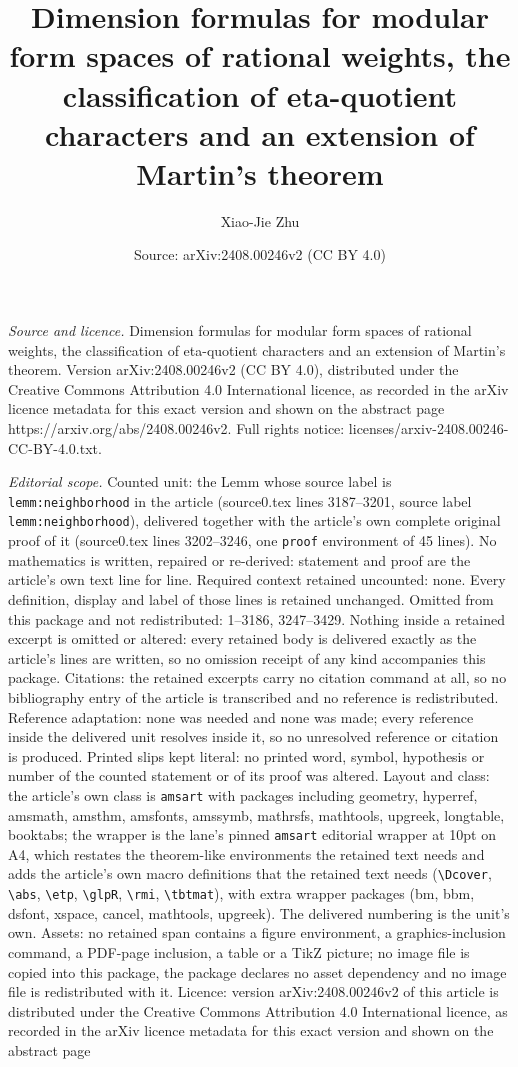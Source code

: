 \documentclass[10pt,a4paper]{amsart}
\title[Dimension formulas for modular form spaces of rational weigh]{Dimension formulas for modular form spaces of rational weights, the classification of eta-quotient characters and an extension of Martin's theorem}
\author{Xiao-Jie Zhu}
\date{Source: arXiv:2408.00246v2 (CC BY 4.0)}
\begin{document}
\maketitle

\noindent\emph{Source and licence.} Dimension formulas for modular form spaces of rational weights, the classification of eta-quotient characters and an extension of Martin's theorem. Version arXiv:2408.00246v2 (CC BY 4.0), distributed under the Creative Commons Attribution 4.0 International licence, as recorded in the arXiv licence metadata for this exact version and shown on the abstract page https://arxiv.org/abs/2408.00246v2. Full rights notice: licenses/arxiv-2408.00246-CC-BY-4.0.txt.\par\smallskip

\noindent\textit{Editorial scope.} Counted unit: the Lemm whose source label is \texttt{lemm:neighborhood} in the article (source0.tex lines 3187--3201, source label \texttt{lemm:neighborhood}), delivered together with the article's own complete original proof of it (source0.tex lines 3202--3246, one \texttt{proof} environment of 45 lines). No mathematics is written, repaired or re-derived: statement and proof are the article's own text line for line. Required context retained uncounted: none. Every definition, display and label of those lines is retained unchanged. Omitted from this package and not redistributed: 1--3186, 3247--3429. Nothing inside a retained excerpt is omitted or altered: every retained body is delivered exactly as the article's lines are written, so no omission receipt of any kind accompanies this package. Citations: the retained excerpts carry no citation command at all, so no bibliography entry of the article is transcribed and no reference is redistributed. Reference adaptation: none was needed and none was made; every reference inside the delivered unit resolves inside it, so no unresolved reference or citation is produced. Printed slips kept literal: no printed word, symbol, hypothesis or number of the counted statement or of its proof was altered. Layout and class: the article's own class is \texttt{amsart} with packages including geometry, hyperref, amsmath, amsthm, amsfonts, amssymb, mathrsfs, mathtools, upgreek, longtable, booktabs; the wrapper is the lane's pinned \texttt{amsart} editorial wrapper at 10pt on A4, which restates the theorem-like environments the retained text needs and adds the article's own macro definitions that the retained text needs (\texttt{\textbackslash Dcover}, \texttt{\textbackslash abs}, \texttt{\textbackslash etp}, \texttt{\textbackslash glpR}, \texttt{\textbackslash rmi}, \texttt{\textbackslash tbtmat}), with extra wrapper packages (bm, bbm, dsfont, xspace, cancel, mathtools, upgreek). The delivered numbering is the unit's own. Assets: no retained span contains a figure environment, a graphics-inclusion command, a PDF-page inclusion, a table or a TikZ picture; no image file is copied into this package, the package declares no asset dependency and no image file is redistributed with it. Licence: version arXiv:2408.00246v2 of this article is distributed under the Creative Commons Attribution 4.0 International licence, as recorded in the arXiv licence metadata for this exact version and shown on the abstract page 
\end{document}

